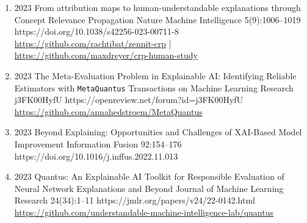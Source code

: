 {\begin{enumerate}
    \item {}
                        {2023}
                        {From attribution maps to human-understandable explanations through Concept Relevance Propagation}
                        {Nature Machine Intelligence}
                        {5(9):1006--1019}
                        {https://doi.org/10.1038/s42256-023-00711-8}
                        {   \\
                            \href{https://github.com/rachtibat/zennit-crp}{https://github.com/rachtibat/zennit-crp} |
                            \href{https://github.com/maxdreyer/crp-human-study}{https://github.com/maxdreyer/crp-human-study}
                        }

    \item {}
                        {2023}
                        {The Meta-Evaluation Problem in Explainable AI: Identifying Reliable Estimators with \texttt{MetaQuantus}}
                        {Transactions on Machine Learning Research}
                        {j3FK00HyfU}
                        {https://openreview.net/forum?id=j3FK00HyfU}
                        {\\\href{https://github.com/annahedstroem/MetaQuantus}{https://github.com/annahedstroem/MetaQuantus}}

    \item {}
                        {2023}
                        {Beyond Explaining: Opportunities and Challenges of XAI-Based Model Improvement}
                        {Information Fusion}
                        {92:154--176}
                        {https://doi.org/10.1016/j.inffus.2022.11.013}

    \item {}
                        {2023}
                        {Quantus: An Explainable AI Toolkit for Responsible Evaluation of Neural Network Explanations and Beyond}
                        {Journal of Machine Learning Research}
                        {24(34):1--11}
                        {https://jmlr.org/papers/v24/22-0142.html}
                        {\\\href{https://github.com/understandable-machine-intelligence-lab/quantus}{https://github.com/understandable-machine-intelligence-lab/quantus}}


\end{enumerate}}
